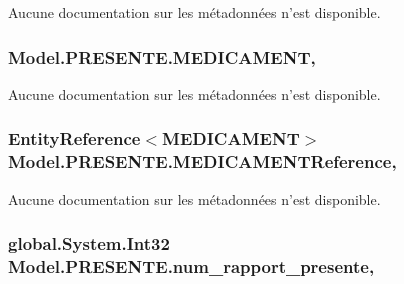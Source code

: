 Aucune documentation sur les métadonnées n'est disponible. 

\hypertarget{class_model_1_1_p_r_e_s_e_n_t_e_a1ba7b02960d2fcfa2a5ab6f9ad072a0a}{
\subsubsection[{M\-E\-D\-I\-C\-A\-M\-E\-N\-T}]{ Model.\-P\-R\-E\-S\-E\-N\-T\-E.\-M\-E\-D\-I\-C\-A\-M\-E\-N\-T\hspace{0.3cm}{\ttfamily [get]}, {\ttfamily [set]}}}\label{class_model_1_1_p_r_e_s_e_n_t_e_a1ba7b02960d2fcfa2a5ab6f9ad072a0a}


Aucune documentation sur les métadonnées n'est disponible. 

\hypertarget{class_model_1_1_p_r_e_s_e_n_t_e_aba9cfc5f5f059bd6e19449eb96aadd3a}{
\subsubsection[{M\-E\-D\-I\-C\-A\-M\-E\-N\-T\-Reference}]{\setlength{\rightskip}{0pt plus 5cm}Entity\-Reference$<${\bf M\-E\-D\-I\-C\-A\-M\-E\-N\-T}$>$ Model.\-P\-R\-E\-S\-E\-N\-T\-E.\-M\-E\-D\-I\-C\-A\-M\-E\-N\-T\-Reference\hspace{0.3cm}{\ttfamily [get]}, {\ttfamily [set]}}}\label{class_model_1_1_p_r_e_s_e_n_t_e_aba9cfc5f5f059bd6e19449eb96aadd3a}


Aucune documentation sur les métadonnées n'est disponible. 

\hypertarget{class_model_1_1_p_r_e_s_e_n_t_e_a61ceff1e6daaf303f9bdc311fe3f140e}{
\subsubsection[{num\-\_\-rapport\-\_\-presente}]{\setlength{\rightskip}{0pt plus 5cm}global.\-System.\-Int32 Model.\-P\-R\-E\-S\-E\-N\-T\-E.\-num\-\_\-rapport\-\_\-presente\hspace{0.3cm}{\ttfamily [get]}, {\ttfamily [set]}}}\label{class_model_1_1_p_r_e_s_e_n_t_e_a61ceff1e6daaf303f9bdc311fe3f140e}


